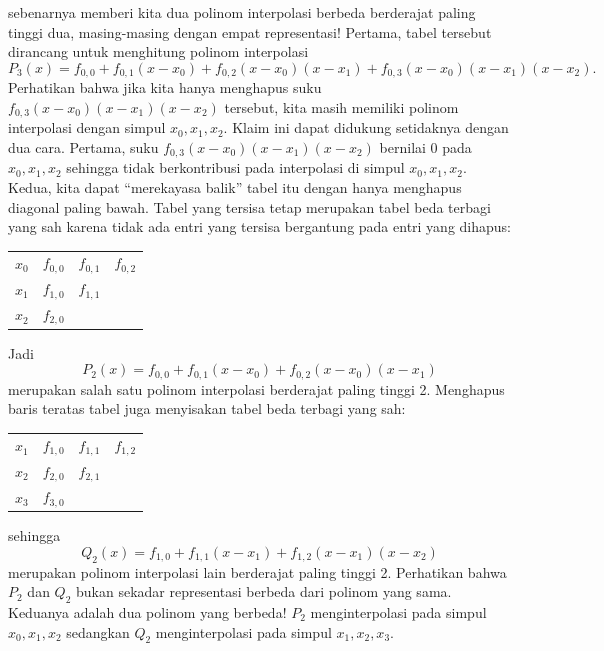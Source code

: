 \noindent sebenarnya memberi kita dua polinom interpolasi berbeda
berderajat paling tinggi dua, masing-masing dengan empat representasi!
Pertama, tabel tersebut dirancang untuk menghitung polinom interpolasi
\[
P_{3}(x)=f_{0,0}+f_{0,1}(x-x_{0})+f_{0,2}(x-x_{0})(x-x_{1})+f_{0,3}(x-x_{0})(x-x_{1})(x-x_{2}).
\]
Perhatikan bahwa jika kita hanya menghapus suku $f_{0,3}(x-x_{0})(x-x_{1})(x-x_{2})$
tersebut, kita masih memiliki polinom interpolasi dengan simpul $x_{0},x_{1},x_{2}$.
Klaim ini dapat didukung setidaknya dengan dua cara. Pertama, suku
$f_{0,3}(x-x_{0})(x-x_{1})(x-x_{2})$ bernilai $0$ pada $x_{0},x_{1},x_{2}$
sehingga tidak berkontribusi pada interpolasi di simpul $x_{0},x_{1},x_{2}$.
Kedua, kita dapat ``merekayasa balik'' tabel itu dengan hanya menghapus
diagonal paling bawah. Tabel yang tersisa tetap merupakan tabel beda
terbagi yang sah karena tidak ada entri yang tersisa bergantung pada
entri yang dihapus:

\begin{center}
\begin{tabular}{c|ccc}
$x_{0}$ & $f_{0,0}$ & $f_{0,1}$ & $f_{0,2}$\tabularnewline
$x_{1}$ & $f_{1,0}$ & $f_{1,1}$ & \tabularnewline
$x_{2}$ & $f_{2,0}$ &  & \tabularnewline
\end{tabular}
\par\end{center}

\noindent Jadi 
\[
P_{2}(x)=f_{0,0}+f_{0,1}(x-x_{0})+f_{0,2}(x-x_{0})(x-x_{1})
\]
merupakan salah satu polinom interpolasi berderajat paling tinggi
2. Menghapus baris teratas tabel juga menyisakan tabel beda terbagi
yang sah:

\begin{center}
\begin{tabular}{c|ccc}
$x_{1}$ & $f_{1,0}$ & $f_{1,1}$ & $f_{1,2}$\tabularnewline
$x_{2}$ & $f_{2,0}$ & $f_{2,1}$ & \tabularnewline
$x_{3}$ & $f_{3,0}$ &  & \tabularnewline
\end{tabular}
\par\end{center}

\noindent sehingga
\[
Q_{2}(x)=f_{1,0}+f_{1,1}(x-x_{1})+f_{1,2}(x-x_{1})(x-x_{2})
\]
merupakan polinom interpolasi lain berderajat paling tinggi 2. Perhatikan
bahwa $P_{2}$ dan $Q_{2}$ bukan sekadar representasi berbeda dari
polinom yang sama. Keduanya adalah dua polinom yang berbeda! $P_{2}$
menginterpolasi pada simpul $x_{0},x_{1},x_{2}$ sedangkan $Q_{2}$
menginterpolasi pada simpul $x_{1},x_{2},x_{3}$. 

